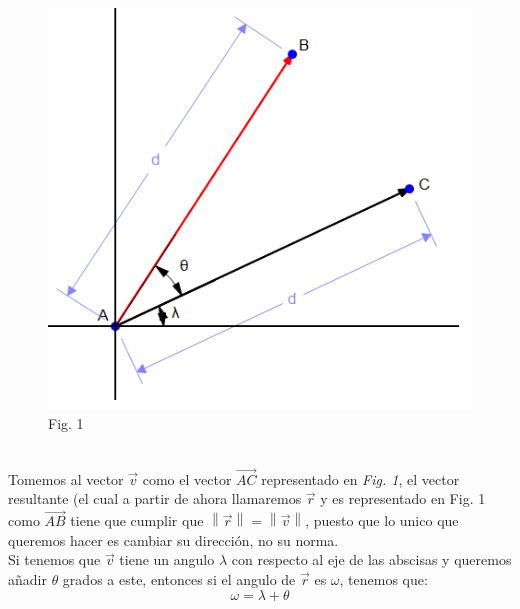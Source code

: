 \documentclass{article}
\begin{document}
\begin{figure}
  \centering
  \includegraphics[width=0.4\columnwidth]{1.png}
    Fig. 1 
\end{figure}
\hfill
\\
\hfill
Tomemos al vector \begin{math}\overrightarrow{v}\end{math} como el vector \begin{math}\overrightarrow{AC}\end{math} representado en \textit{Fig. 1}, el vector resultante (el cual a partir de ahora llamaremos \begin{math}\overrightarrow{r}\end{math} y es representado en Fig. 1 como \begin{math}\overrightarrow{AB}\end{math} tiene que cumplir que \begin{math} \left \| \overrightarrow{r} \right \| = \left \| \overrightarrow{v} \right \| \end{math}, puesto que lo unico que queremos hacer es cambiar su dirección, no su norma.\\
Si tenemos que \begin{math}\overrightarrow{v}\end{math} tiene un angulo \begin{math}\lambda\end{math} con respecto al eje de las abscisas y queremos añadir \begin{math}\theta\end{math} grados a este, entonces si el angulo de \begin{math}\overrightarrow{r}\end{math} es \begin{math}\omega\end{math}, tenemos que: 
\begin{equation}\omega=\lambda+\theta\end{equation}
\end{document}
